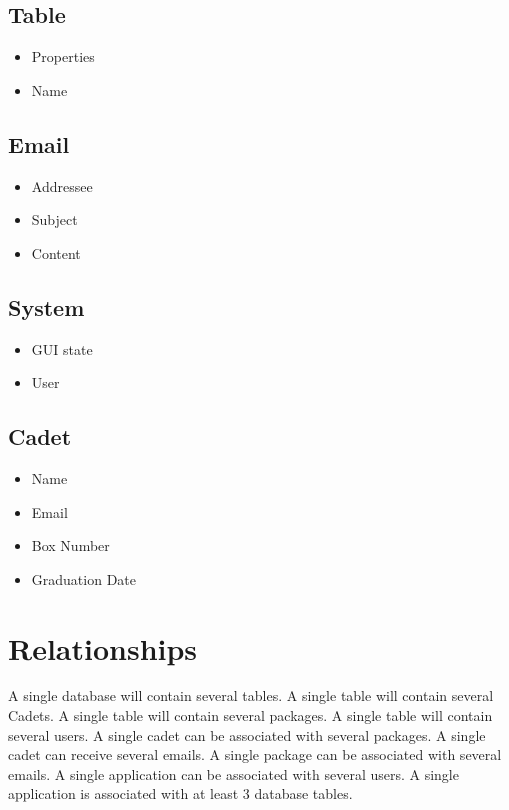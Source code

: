 \documentclass[11pt]{article}
\begin{document}
\subsection{Table}
\label{sec:orgeb1f7fb}
\begin{itemize}
\item Properties
\item Name
\end{itemize}
\subsection{Email}
\label{sec:org1801844}
\begin{itemize}
\item Addressee
\item Subject
\item Content
\end{itemize}
\subsection{System}
\label{sec:org1792646}
\begin{itemize}
\item GUI state
\item User
\end{itemize}
\subsection{Cadet}
\label{sec:orgd72d0fa}
\begin{itemize}
\item Name
\item Email
\item Box Number
\item Graduation Date
\end{itemize}

\section{Relationships}
\label{sec:org84bc54c}
A single database will contain several tables.
A single table will contain several Cadets.
A single table will contain several packages.
A single table will contain several users.
A single cadet can be associated with several packages.
A single cadet can receive several emails.
A single package can be associated with several emails.
A single application can be associated with several users.
A single application is associated with at least 3 database tables.
\end{document}
